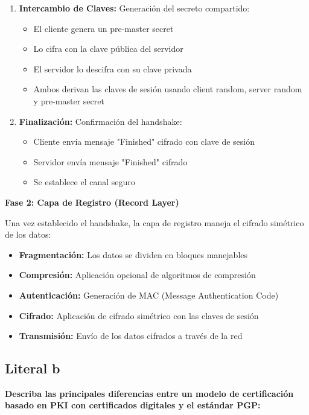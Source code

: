 {\begin{enumerate}
    \item \textbf{Intercambio de Claves:} Generación del secreto compartido:
    \begin{itemize}
        \item El cliente genera un pre-master secret
        \item Lo cifra con la clave pública del servidor
        \item El servidor lo descifra con su clave privada
        \item Ambos derivan las claves de sesión usando client random, server random y pre-master secret
    \end{itemize}
    
    \item \textbf{Finalización:} Confirmación del handshake:
    \begin{itemize}
        \item Cliente envía mensaje "Finished" cifrado con clave de sesión
        \item Servidor envía mensaje "Finished" cifrado
        \item Se establece el canal seguro
    \end{itemize}
\end{enumerate}

\textbf{Fase 2: Capa de Registro (Record Layer)}

Una vez establecido el handshake, la capa de registro maneja el cifrado simétrico de los datos:

\begin{itemize}
    \item \textbf{Fragmentación:} Los datos se dividen en bloques manejables
    \item \textbf{Compresión:} Aplicación opcional de algoritmos de compresión
    \item \textbf{Autenticación:} Generación de MAC (Message Authentication Code)
    \item \textbf{Cifrado:} Aplicación de cifrado simétrico con las claves de sesión
    \item \textbf{Transmisión:} Envío de los datos cifrados a través de la red
\end{itemize}



\subsection{Literal b}
\textbf{Describa las principales diferencias entre un modelo de certificación basado en PKI
con certificados digitales y el estándar PGP:}

}

